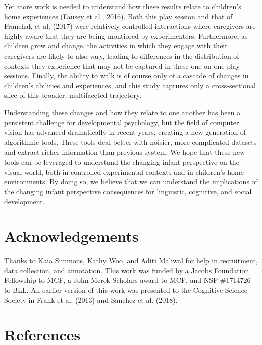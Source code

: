 \documentclass[english,man]{apa6}
\begin{document}
Yet more work is needed to understand how these results relate to
children's home experiences (Fausey et al., 2016). Both this play
session and that of Franchak et al. (2017) were relatively controlled
interactions where caregivers are highly aware that they are being
montiored by experimenters. Furthermore, as children grow and change,
the activities in which they engage with their caregivers are likely to
also vary, leading to differences in the distribution of contexts they
experience that may not be captured in these one-on-one play sessions.
Finally, the ability to walk is of course only of a cascade of changes
in children's abilities and experiences, and this study captures only a
cross-sectional slice of this broader, multifaceted trajectory.

Understanding these changes and how they relate to one another has been
a persistent challenge for developmental psychology, but the field of
computer vision has advanced dramatically in recent years, creating a
new generation of algorithmic tools. These tools deal better with
noisier, more complicated datasets and extract richer information than
previous system. We hope that these new tools can be leveraged to
understand the changing infant perspective on the visual world, both in
controlled experimental contexts and in children's home environments. By
doing so, we believe that we can understand the implications of the
changing infant perspective consequences for linguistic, cognitive, and
social development.

\section{Acknowledgements}\label{acknowledgements}

Thanks to Kaia Simmons, Kathy Woo, and Aditi Maliwal for help in
recruitment, data collection, and annotation. This work was funded by a
Jacobs Foundation Fellowship to MCF, a John Merck Scholars award to MCF,
and NSF \#1714726 to BLL. An earlier version of this work was presented
to the Cognitive Science Society in Frank et al. (2013) and Sanchez et
al. (2018).

\newpage

\section{References}\label{references}

\begingroup
\setlength{\parindent}{-0.5in} \setlength{\leftskip}{0.5in}
\end{document}

